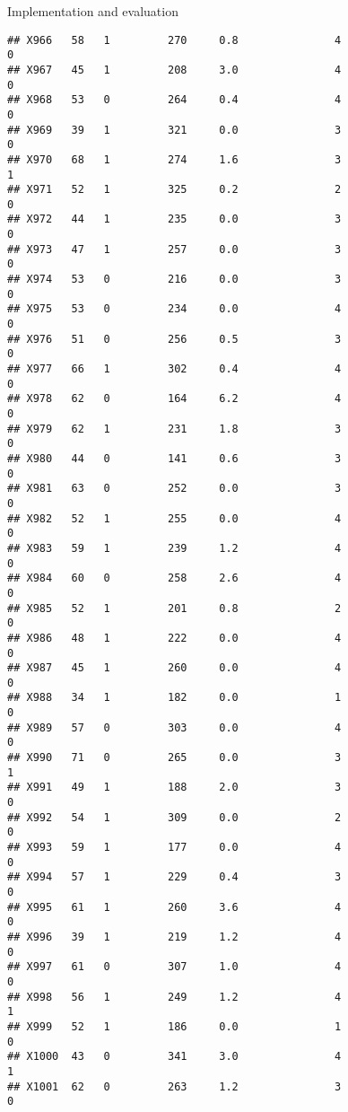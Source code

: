 \documentclass[
  ignorenonframetext,
]{beamer}
\begin{document}
\begin{frame}[fragile]{Implementation and evaluation}
\begin{verbatim}
## X966   58   1         270     0.8               4                   0
## X967   45   1         208     3.0               4                   0
## X968   53   0         264     0.4               4                   0
## X969   39   1         321     0.0               3                   0
## X970   68   1         274     1.6               3                   1
## X971   52   1         325     0.2               2                   0
## X972   44   1         235     0.0               3                   0
## X973   47   1         257     0.0               3                   0
## X974   53   0         216     0.0               3                   0
## X975   53   0         234     0.0               4                   0
## X976   51   0         256     0.5               3                   0
## X977   66   1         302     0.4               4                   0
## X978   62   0         164     6.2               4                   0
## X979   62   1         231     1.8               3                   0
## X980   44   0         141     0.6               3                   0
## X981   63   0         252     0.0               3                   0
## X982   52   1         255     0.0               4                   0
## X983   59   1         239     1.2               4                   0
## X984   60   0         258     2.6               4                   0
## X985   52   1         201     0.8               2                   0
## X986   48   1         222     0.0               4                   0
## X987   45   1         260     0.0               4                   0
## X988   34   1         182     0.0               1                   0
## X989   57   0         303     0.0               4                   0
## X990   71   0         265     0.0               3                   1
## X991   49   1         188     2.0               3                   0
## X992   54   1         309     0.0               2                   0
## X993   59   1         177     0.0               4                   0
## X994   57   1         229     0.4               3                   0
## X995   61   1         260     3.6               4                   0
## X996   39   1         219     1.2               4                   0
## X997   61   0         307     1.0               4                   0
## X998   56   1         249     1.2               4                   1
## X999   52   1         186     0.0               1                   0
## X1000  43   0         341     3.0               4                   1
## X1001  62   0         263     1.2               3                   0

\end{verbatim}
\end{frame}
\end{document}
